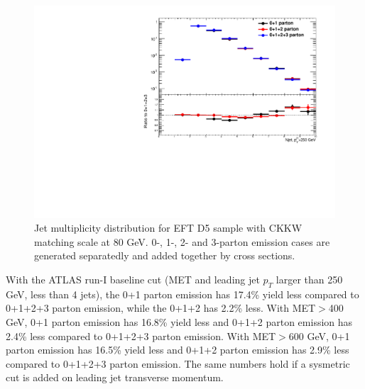 \begin{figure}[h!]
	\centering  
	\includegraphics[width=0.8\linewidth]{figures/monojet_appendix/h_njet250.pdf}
	\caption{Jet multiplicity distribution for EFT D5 sample with CKKW matching scale at 80 GeV. 0-, 1-, 2- and 3-parton emission cases are generated separatedly and added together by cross sections.}
	\label{fig:RatioKine_D5_2}
\end{figure}

With the ATLAS run-I baseline cut (MET and leading jet $p_{T}$ larger than 250 GeV, less than 4 jets), the 0+1 parton emission has 17.4\% yield less compared to 0+1+2+3 parton emission, while the 0+1+2 has 2.2\% less. With MET$>$400 GeV, 0+1 parton emission has 16.8\% yield less and 0+1+2 parton emission has 2.4\% less compared to 0+1+2+3 parton emission. With MET$>$600 GeV, 0+1 parton emission has 16.5\% yield less and 0+1+2 parton emission has 2.9\% less compared to 0+1+2+3 parton emission. The same numbers hold if a sysmetric cut is added on leading jet transverse momentum.
